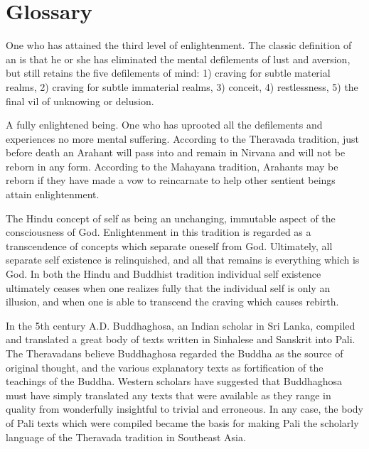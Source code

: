 \documentclass[a5paper,10pt,english]{book}
\begin{document}
\chapter{Glossary}
\label{\detokenize{glossary:glossary}}\label{\detokenize{glossary::doc}}\begin{description}
\sphinxAtStartPar
One who has attained the third level of enlightenment. The
classic definition of an  is that he or she has eliminated
the mental defilements of lust and aversion, but still retains the five
defilements of mind: 1) craving for subtle material realms, 2) craving
for subtle immaterial realms, 3) conceit, 4) restlessness, 5) the final
vil of unknowing or delusion.

\sphinxAtStartPar
A fully enlightened being. One who has uprooted all the
defilements and experiences no more mental suffering. According to the
Theravada tradition, just before death an Arahant will pass into and
remain in Nirvana and will not be reborn in any form. According to the
Mahayana tradition, Arahants may be reborn if they have made a vow to
reincarnate to help other sentient beings attain enlightenment.

\sphinxAtStartPar
The Hindu concept of self as being an unchanging, immutable aspect
of the consciousness of God. Enlightenment in this tradition is regarded
as a transcendence of concepts which separate oneself from God.
Ultimately, all separate self existence is relinquished, and all that
remains is everything which is God. In both the Hindu and Buddhist
tradition individual self existence ultimately ceases when one realizes
fully that the individual self is only an illusion, and when one is able
to transcend the craving which causes rebirth.

\sphinxAtStartPar
In the 5th century A.D. Buddhaghosa, an Indian scholar in
Sri Lanka, compiled and translated a great body of texts written
in Sinhalese and Sanskrit into Pali. The Theravadans believe Buddhaghosa
regarded the Buddha as the source of original thought, and the various
explanatory texts as fortification of the teachings of the Buddha.
Western scholars have suggested that Buddhaghosa must have simply
translated any texts that were available as they range in quality from
wonderfully insightful to trivial and erroneous. In any case, the body
of Pali texts which were compiled became the basis for making Pali the
scholarly language of the Theravada tradition in Southeast Asia.


\end{description}
\end{document}
